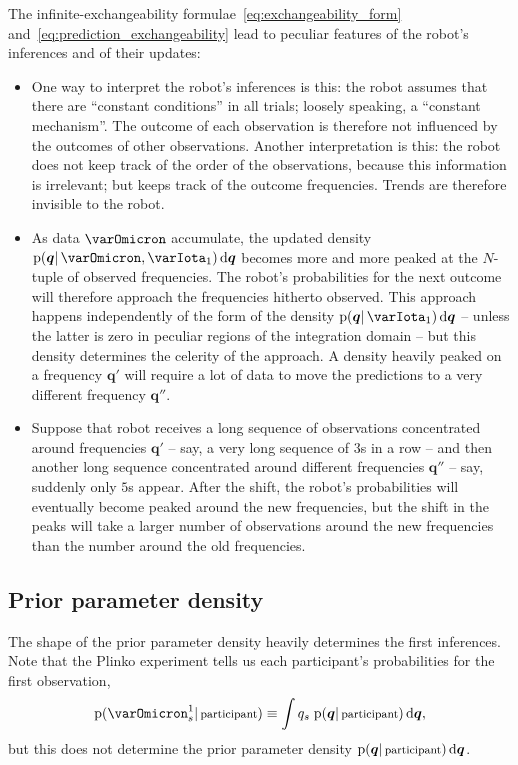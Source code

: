 \documentclass[\ifafour a4paper,12pt,\else a5paper,10pt,\fi%
onecolumn,oneside,article,%
british%
]{memoir}
\theoremstyle{remark}
\theoremstyle{innote}
\newcommand*{\di}{\mathrm{d}}%
\newcommand*{\pf}{\mathrm{p}}%
\renewcommand*{\|}{\mathpunct{|}}
\newcommand*{\yqq}{q}
\newcommand*{\yq}{\bm{\yqq}}
\newcommand*{\yI}{\varIota}
\newcommand*{\yMJ}{\yI_1}
\begin{document}
The infinite-exchangeability formulae~\eqref{eq:exchangeability_form}
and~\eqref{eq:prediction_exchangeability} lead to peculiar features of the
robot's inferences and of their updates:
\begin{itemize}
\item One way to interpret the robot's inferences is this: the robot
  assumes that there are \enquote{constant conditions} in all trials;
  loosely speaking, a \enquote{constant mechanism}. The outcome of each
  observation is therefore not influenced by the outcomes of other
  observations. Another interpretation is this: the robot does not keep
  track of the order of the observations, because this information is
  irrelevant; but keeps track of the outcome frequencies. Trends are
  therefore invisible to the robot.
\item As data $\varOmicron$ accumulate, the updated density
  $\pf(\yq \| \varOmicron, \yMJ)\,\di\yq$ becomes more and more peaked at the
  $N$-tuple of observed frequencies. The robot's probabilities for the next
  outcome will therefore approach the frequencies hitherto observed. This
  approach happens independently of the form of the density
  $\pf(\yq \| \yMJ)\,\di\yq$ -- unless the latter is zero in peculiar
  regions of the integration domain -- but this density determines the
  celerity of the approach. A density heavily peaked on a frequency $\yq'$
  will require a lot of data to move the predictions to a very different
  frequency $\yq''$.
\item Suppose that robot receives a long sequence of observations
  concentrated around frequencies $\yq'$ -- say, a very long sequence of
  $3$s in a row -- and then another long sequence concentrated around
  different frequencies $\yq''$ -- say, suddenly only $5$s appear. After
  the shift, the robot's probabilities will eventually become peaked around
  the new frequencies, but the shift in the peaks will take a larger number
  of observations around the new frequencies than the number around the old
  frequencies.
\end{itemize}


\subsection{Prior parameter density}
\label{sec:initial_prior}

The shape of the prior parameter density heavily determines the first
inferences. Note that the Plinko experiment tells us each participant's
probabilities for the first observation,
\begin{equation}
  \label{eq:initial_predictive}
  \pf(\varOmicron^1_{s} \| \text{\footnotesize participant}) \equiv \int \yqq_{s}\;
  \pf(\yq \| \text{\footnotesize participant})\,\di\yq,
\end{equation}
but this does not determine the prior parameter density
$\pf(\yq \| \text{\footnotesize participant})\,\di\yq$.
\end{document}
